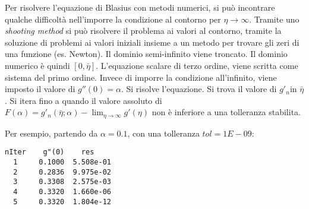 Per risolvere l'equazione di Blasius con metodi numerici, si può incontrare qualche difficoltà
nell'imporre la condizione al contorno per $\eta \to \infty$.
Tramite uno \textit{shooting method} si può risolvere il problema ai valori al contorno, tramite 
la soluzione di problemi ai valori iniziali insieme a un metodo per trovare gli zeri di una
funzione (es. Newton).
Il dominio semi-infinito viene troncato. Il dominio numerico è quindi $[0,\bar{\eta}]$. L'equazione 
scalare di terzo ordine, viene scritta come sistema del primo ordine. Invece di imporre la condizione
all'infinito, viene imposto il valore di $g''(0)=\alpha$. Si risolve l'equazione. Si trova il valore di $g'_n$in $\bar{\eta}$.
Si itera fino a quando il valore assoluto di $F(\alpha) = g'_n(\bar{\eta};\alpha) - \lim_{\eta\to \infty} g'(\eta)$ non è inferiore 
a una tolleranza stabilita.

Per esempio, partendo da $\alpha=0.1$, con una tolleranza $tol = 1E-09$:
\begin{center}
\begin{verbatim}
nIter    g"(0)    res 
  1     0.1000  5.508e-01 
  2     0.2836  9.975e-02 
  3     0.3308  2.575e-03 
  4     0.3320  1.660e-06 
  5     0.3320  1.804e-12
\end{verbatim}
\end{center}
    


